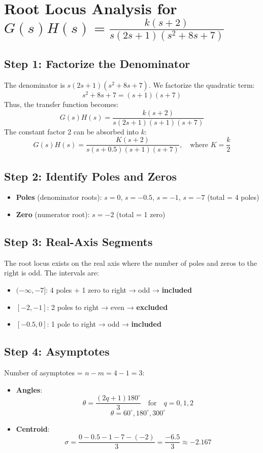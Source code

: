 \documentclass{article}
\begin{document}
	
	\section*{Root Locus Analysis for \( G(s)H(s) = \frac{k(s+2)}{s(2s+1)(s^2+8s+7)} \)}
	
	\subsection*{Step 1: Factorize the Denominator}
	The denominator is \( s(2s+1)(s^2+8s+7) \). We factorize the quadratic term:
	\[ s^2 + 8s + 7 = (s+1)(s+7) \]
	Thus, the transfer function becomes:
	\[ G(s)H(s) = \frac{k(s+2)}{s(2s+1)(s+1)(s+7)} \]
	The constant factor 2 can be absorbed into \(k\):
	\[ G(s)H(s) = \frac{K(s+2)}{s(s+0.5)(s+1)(s+7)}, \quad \text{where } K = \frac{k}{2} \]
	
	\subsection*{Step 2: Identify Poles and Zeros}
	\begin{itemize}
		\item \textbf{Poles} (denominator roots): \(s = 0\), \(s = -0.5\), \(s = -1\), \(s = -7\) (total = 4 poles)
		\item \textbf{Zero} (numerator root): \(s = -2\) (total = 1 zero)
	\end{itemize}
	
	\subsection*{Step 3: Real-Axis Segments}
	The root locus exists on the real axis where the number of poles and zeros to the right is odd. The intervals are:
	\begin{itemize}
		\item \((-\infty, -7]\): 4 poles + 1 zero to right → odd → \textbf{included}
		\item \([-2, -1]\): 2 poles to right → even → \textbf{excluded}
		\item \([-0.5, 0]\): 1 pole to right → odd → \textbf{included}
	\end{itemize}
	
	\subsection*{Step 4: Asymptotes}
	Number of asymptotes = \(n - m = 4 - 1 = 3\):
	\begin{itemize}
		\item \textbf{Angles}:
		\[ \theta = \frac{(2q+1)180^\circ}{3} \quad \text{for} \quad q=0,1,2 \]
		\[ \theta = 60^\circ, 180^\circ, 300^\circ \]
		\item \textbf{Centroid}:
		\[ \sigma = \frac{0 - 0.5 - 1 - 7 - (-2)}{3} = \frac{-6.5}{3} \approx -2.167 \]
	\end{itemize}
	
\end{document}

